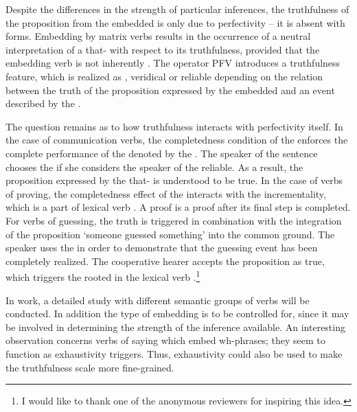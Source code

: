 \documentclass[output=paper,  modfonts,  newtxmath,  hidelinks		  ]{langscibook}
\begin{document}
Despite the differences in the strength of particular inferences, the truthfulness of the proposition from the embedded  is only due to perfectivity – it is absent with  forms. Embedding by  matrix verbs results in the occurrence of a neutral interpretation of a that- with respect to its truthfulness, provided that the embedding  verb is not inherently . The  operator PFV introduces a truthfulness feature, which is realized as , veridical or reliable depending on the relation between the truth of the proposition expressed by the embedded  and an event described by the .

The question remains as to how truthfulness interacts with perfectivity itself. In the case of communication verbs, the completedness condition of the  enforces the complete performance of the  denoted by the . The speaker of the sentence chooses the  if she considers the speaker of the  reliable. As a result, the proposition expressed by the that- is understood to be true. In the case of verbs of proving, the completedness effect of the  interacts with the incrementality, which is a part of lexical verb . A proof is a proof after its final step is completed. For verbs of guessing, the truth  is triggered in combination with the integration of the proposition `someone guessed something' into the common ground. The speaker uses the  in order to demonstrate that the guessing event has been completely realized. The cooperative hearer accepts the proposition as true, which triggers the  rooted in the lexical verb .\footnote{I would like to thank one of the anonymous reviewers for inspiring this idea.}

In  work, a detailed study with different semantic groups of verbs will be conducted. In addition the type of embedding is to be controlled for, since it may be involved in determining the strength of the inference available. An interesting observation concerns  verbs of saying which embed wh-phrases; they seem to function as exhaustivity triggers. Thus, exhaustivity could also be used to make the truthfulness scale more fine-grained.
 
\end{document}
